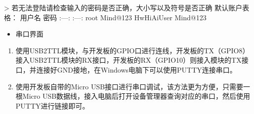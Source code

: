 \begin{enumerate}
  \textgreater{}
  若无法登陆请检查输入的密码是否正确，大小写以及符号是否正确
  默认账户表格： \textbar{} 用户名 \textbar{} 密码 \textbar{} \textbar{}
  :---: \textbar{} :---: \textbar{} \textbar{} root \textbar{} Mind@123
  \textbar{} \textbar{} HwHiAiUser \textbar{} Mind@123 \textbar{}
\end{enumerate}

\begin{itemize}
\tightlist
\item
  串口界面
\end{itemize}

\begin{enumerate}
\def\labelenumi{\arabic{enumi}.}
\tightlist
\item
  使用USB2TTL模块，与开发板的GPIO口进行连线，开发板的TX（GPIO8）接入USB2TTL模块的RX接口，开发板的RX（GPIO10）则接入模块的TX接口，并连接好GND接地，在Windows电脑下可以使用PUTTY连接串口。
\item
  使用开发板自带的Micro
  USB接口进行串口调试，该方法更为方便，只需要一根Micro
  USB数据线，接入电脑后打开设备管理器查询对应的串口，然后使用PUTTY进行链接即可。
\end{enumerate}

